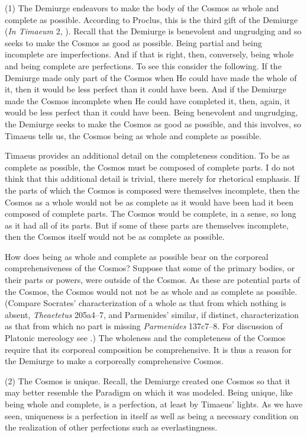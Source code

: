 (1) The Demiurge endeavors to make the body of the Cosmos as whole and complete as possible. According to Proclus, this is the third gift of the Demiurge (\emph{In Timaeum} 2, \citealt{Diehl:1903re}). Recall that the Demiurge is benevolent and ungrudging and so seeks to make the Cosmos as good as possible. Being partial and being incomplete are imperfections. And if that is right, then, conversely, being whole and being complete are perfections. To see this consider the following. If the Demiurge made only part of the Cosmos when He could have made the whole of it, then it would be less perfect than it could have been. And if the Demiurge made the Cosmos incomplete when He could have completed it, then, again, it would be less perfect than it could have been. Being benevolent and ungrudging, the Demiurge seeks to make the Cosmos as good as possible, and this involves, so Timaeus tells us, the Cosmos being as whole and complete as possible.

Timaeus provides an additional detail on the completeness condition. To be as complete as possible, the Cosmos must be composed of complete parts. I do not think that this additional detail is trivial, there merely for rhetorical emphasis. If the parts of which the Cosmos is composed were themselves incomplete, then the Cosmos as a whole would not be as complete as it would have been had it been composed of complete parts. The Cosmos would be complete, in a sense, so long as it had all of its parts. But if some of these parts are themselves incomplete, then the Cosmos itself would not be as complete as possible.

How does being as whole and complete as possible bear on the corporeal comprehensiveness of the Cosmos? Suppose that some of the primary bodies, or their parts or powers, were outside of the Cosmos. As these are potential parts of the Cosmos, the Cosmos would not not be as whole and as complete as possible. (Compare Socrates' characterization of a whole as that from which nothing is absent, \emph{Theaetetus} 205a4--7, and Parmenides' similar, if distinct, characterization as that from which no part is missing \emph{Parmenides} 137c7--8. For discussion of Platonic mereology see \citealt{Harte:2002tl}.) The wholeness and the completeness of the Cosmos require that its corporeal composition be comprehensive. It is thus a reason for the Demiurge to make a corporeally comprehensive Cosmos.

(2) The Cosmos is unique. Recall, the Demiurge created one Cosmos so that it may better resemble the Paradigm on which it was modeled. Being unique, like being whole and complete, is a perfection, at least by Timaeus' lights. As we have seen, uniqueness is a perfection in itself as well as being a necessary condition on the realization of other perfections such as everlastingness.

